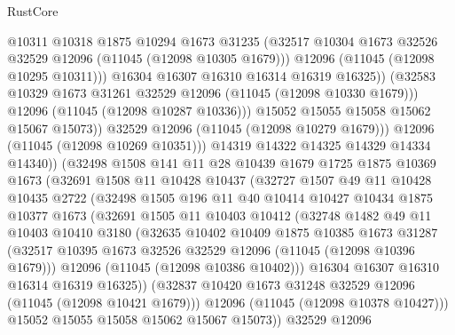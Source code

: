 \begin{lexlean}{RustCore}
\begin{coremodule}
                        @10311
                        @10318
                        @1875
                        @10294
                        @1673
                        @31235
                        (@32517 @10304 @1673 @32526 @32529 @12096 (@11045 (@12098 @10305 @1679)))
                        @12096
                        (@11045 (@12098 @10295 @10311)))
                      @16304
                      @16307
                      @16310
                      @16314
                      @16319
                      @16325))
                  (@32583 @10329 @1673 @31261 @32529 @12096 (@11045 (@12098 @10330 @1679)))
                  @12096
                  (@11045 (@12098 @10287 @10336)))
                @15052
                @15055
                @15058
                @15062
                @15067
                @15073))
            @32529
            @12096
            (@11045 (@12098 @10279 @1679)))
          @12096
          (@11045 (@12098 @10269 @10351)))
        @14319
        @14322
        @14325
        @14329
        @14334
        @14340))
    (@32498
      @1508
      @141
      @11
      @28
      @10439
      @1679
      @1725
      @1875
      @10369
      @1673
      (@32691
        @1508
        @11
        @10428
        @10437
        (@32727
          @1507
          @49
          @11
          @10428
          @10435
          @2722
          (@32498
            @1505
            @196
            @11
            @40
            @10414
            @10427
            @10434
            @1875
            @10377
            @1673
            (@32691
              @1505
              @11
              @10403
              @10412
              (@32748
                @1482
                @49
                @11
                @10403
                @10410
                @3180
                (@32635
                  @10402
                  @10409
                  @1875
                  @10385
                  @1673
                  @31287
                  (@32517 @10395 @1673 @32526 @32529 @12096 (@11045 (@12098 @10396 @1679)))
                  @12096
                  (@11045 (@12098 @10386 @10402)))
                @16304
                @16307
                @16310
                @16314
                @16319
                @16325))
            (@32837 @10420 @1673 @31248 @32529 @12096 (@11045 (@12098 @10421 @1679)))
            @12096
            (@11045 (@12098 @10378 @10427)))
          @15052
          @15055
          @15058
          @15062
          @15067
          @15073))
      @32529
      @12096

\end{coremodule}
\end{lexlean}
